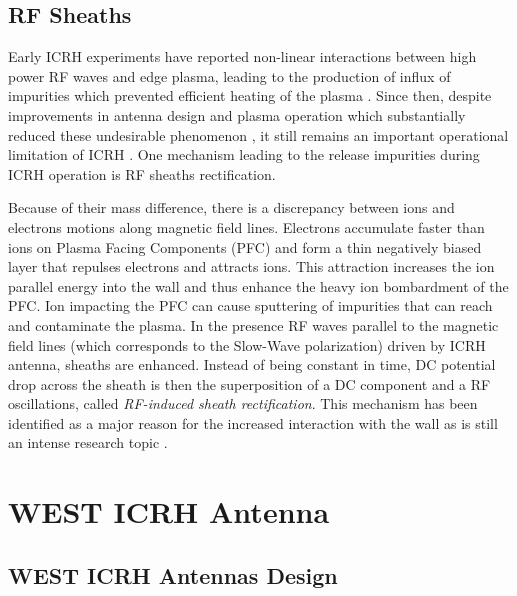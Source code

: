 \subsection{RF Sheaths}\label{sec:RF_sheaths}
Early ICRH experiments have reported non-linear interactions between high power RF waves and edge plasma, leading to the production of influx of impurities which prevented efficient heating of the plasma . Since then, despite improvements in antenna design and plasma operation which substantially reduced these undesirable phenomenon , it still remains an important operational limitation of ICRH . One mechanism leading to the release impurities during ICRH operation is RF sheaths rectification. 

Because of their mass difference, there is a discrepancy between ions and electrons motions along magnetic field lines. Electrons accumulate faster than ions on Plasma Facing Components (PFC) and form a thin negatively biased layer that repulses electrons and attracts ions. This attraction increases the ion parallel energy into the wall and thus enhance the heavy ion bombardment of the PFC. Ion impacting the PFC can cause sputtering of impurities that can reach and contaminate the plasma. In the presence RF waves parallel to the magnetic field lines (which corresponds to the Slow-Wave polarization) driven by ICRH antenna, sheaths are enhanced. Instead of being constant in time, DC potential drop across the sheath is then the superposition of a DC component and a RF oscillations, called \textit{RF-induced sheath rectification}. This  mechanism has been identified as a major reason for the increased interaction with the wall as is still an intense research topic .



\section{WEST ICRH Antenna}\label{eq:WEST_ICRF_work}


\subsection{WEST ICRH Antennas Design}\label{eq:WEST_ICRH_antenna}

